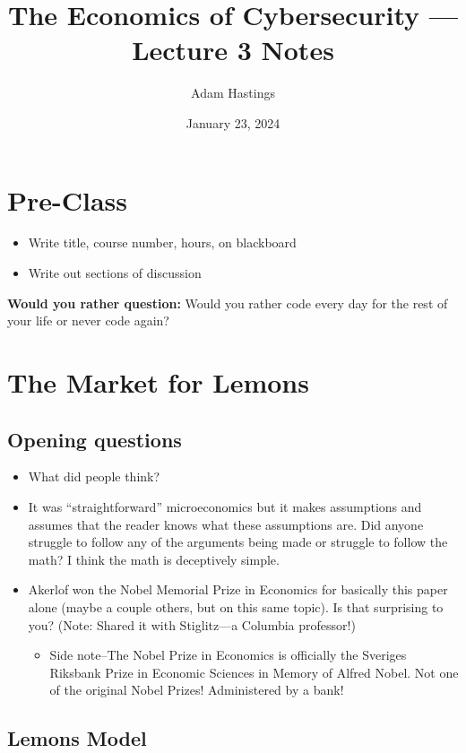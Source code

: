 \documentclass[11pt]{article}
\title{The Economics of Cybersecurity --- Lecture 3 Notes}
\date{January 23, 2024}
\author{Adam Hastings}
\begin{document}
\maketitle

\section*{Pre-Class}
\begin{itemize}
    \item Write title, course number, hours, on blackboard
    \item Write out sections of discussion
\end{itemize}

{\bf Would you rather question:} Would you rather code every day for the rest of your life or never code again?


\section{The Market for Lemons}

\subsection{Opening questions}
\begin{itemize}
    \item What did people think?
    \item It was ``straightforward'' microeconomics but it makes assumptions and assumes that the reader knows what these assumptions are. Did anyone struggle to follow any of the arguments being made or struggle to follow the math? I think the math is deceptively simple.
    \item Akerlof won the Nobel Memorial Prize in Economics for basically this paper alone (maybe a couple others, but on this same topic). Is that surprising to you? (Note: Shared it with Stiglitz---a Columbia professor!)
    \begin{itemize}
        \item Side note--The Nobel Prize in Economics is officially the Sveriges Riksbank Prize in Economic Sciences in Memory of Alfred Nobel. Not one of the original Nobel Prizes! Administered by a bank!
    \end{itemize}
\end{itemize}



\subsection{Lemons Model}
\end{document}
